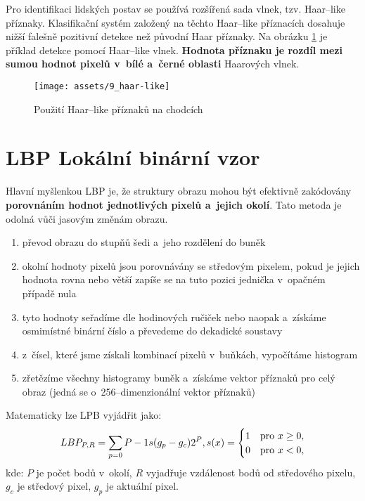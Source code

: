 Pro identifikaci lidských postav se používá rozšířená sada vlnek, tzv. Haar--like příznaky. Klasifikační systém založený na těchto Haar--like příznacích dosahuje nižší falešně pozitivní detekce než původní Haar příznaky. Na obrázku \ref{fig:haarlike} je příklad detekce pomocí Haar--like vlnek. \textbf{Hodnota příznaku je rozdíl mezi sumou hodnot pixelů v~bílé a~černé oblasti} Haarových vlnek.
\begin{figure}[H]
    \centering
    \texttt{[image: assets/9\_haar-like]}
    \caption{Použití Haar--like příznaků na chodcích}
    \label{fig:haarlike}
\end{figure}

\section{LBP Lokální binární vzor}
Hlavní myšlenkou LBP je, že struktury obrazu mohou být efektivně zakódovány \textbf{porovnáním hodnot jednotlivých pixelů a~jejich okolí}. Tato metoda je odolná vůči jasovým změnám obrazu.
\begin{enumerate}
    \item převod obrazu do stupňů šedi a~jeho rozdělení do buněk
    \item okolní hodnoty pixelů jsou porovnávány se středovým pixelem, pokud je jejich hodnota rovna nebo větší zapíše se na tuto pozici jednička v~opačném případě nula
    \item tyto hodnoty seřadíme dle hodinových ručiček nebo naopak a~získáme osmimístné binární číslo a převedeme do dekadické soustavy
    \item z~čísel, které jsme získali kombinací pixelů v~buňkách, vypočítáme histogram
    \item zřetězíme všechny histogramy buněk a~získáme vektor příznaků pro celý obraz (jedná se o~256--dimenzionální vektor příznaků)
\end{enumerate}
Matematicky lze LPB vyjádřit jako:
\begin{equation*}
    LBP_{P,R} = \sum_{p=0}{P-1} s(g_p - g_c)2^P, \\
    s(x) =
    \begin{cases}
        1 & \text{pro } x \geq 0, \\
        0 & \text{pro } x < 0,
    \end{cases}
\end{equation*}
kde: $P$ je počet bodů v~okolí, $R$ vyjadřuje vzdálenost bodů od středového pixelu, $g_c$ je středový pixel, $g_p$ je aktuální pixel.


